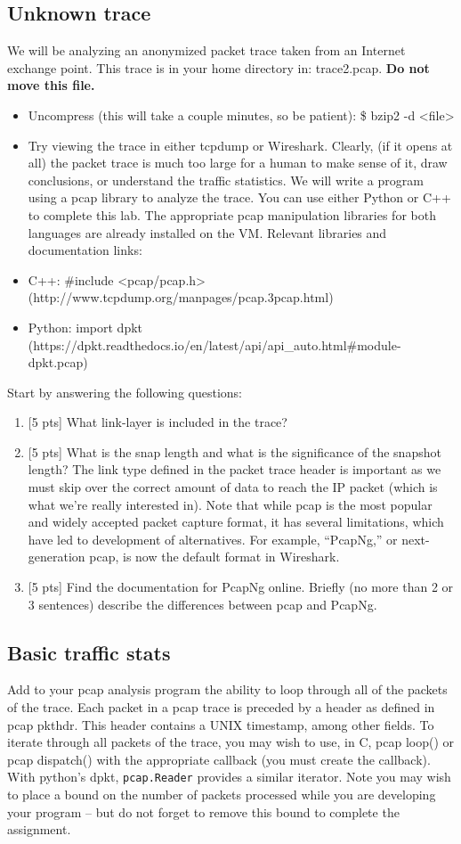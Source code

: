 \subsection{Unknown trace}
We will be analyzing an anonymized packet trace taken from an Internet exchange point.  This trace is
in your home directory in: trace2.pcap.  \textbf{Do not move this file.}
\begin{itemize}
\item Uncompress (this will take a couple minutes, so be patient): \$ bzip2 -d <file>
\item Try viewing the trace in either tcpdump or Wireshark.
Clearly, (if it opens at all) the packet trace is much too large for a human to make sense of it, draw conclusions, or understand the traffic statistics. We will write a program using a pcap library to analyze the trace. You can use either Python or C++ to complete this lab. The appropriate pcap manipulation libraries for both languages are already installed on the VM.
Relevant libraries and documentation links:
\item C++: \#include <pcap/pcap.h> (http://www.tcpdump.org/manpages/pcap.3pcap.html)
\item Python: import dpkt (https://dpkt.readthedocs.io/en/latest/api/api\_auto.html\#module-dpkt.pcap)
\end{itemize}

Start by answering the following questions:
\begin{enumerate}
\item{[5 pts]} What link-layer is included in the trace?
\item {[5 pts]} What is the snap length and what is the significance of the snapshot length?
The link type defined in the packet trace header is important as we must skip over the correct amount of data to reach the IP packet (which is what we’re really interested in).
Note that while pcap is the most popular and widely accepted packet capture format, it has several limitations, which have led to development of
alternatives. For example, “PcapNg,” or next-generation pcap, is now the default format in Wireshark.
\item {[5 pts]} Find the documentation for PcapNg online. Briefly (no more than 2 or 3 sentences) describe the differences between pcap and PcapNg.
\end{enumerate}

\subsection{Basic traffic stats}
Add to your pcap analysis program the ability to loop through all of the packets of the trace. Each packet in a pcap trace is preceded by a header as defined in pcap pkthdr. This header contains a UNIX timestamp, among other fields. To iterate through all packets of the trace, you may wish to use, in C, pcap loop() or pcap dispatch() with the appropriate callback (you must create the callback). With python's dpkt, {\tt pcap.Reader} provides a similar iterator.  Note you may wish to place a bound on the number
of packets processed while you are developing your program -- but do not forget to remove this bound to complete the 
assignment.

